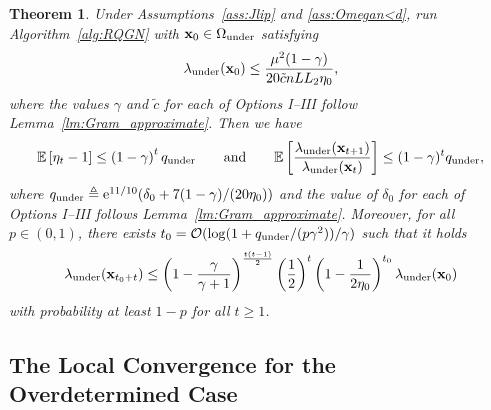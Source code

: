 \documentclass[11pt]{article}
\theoremstyle{plain}
\newtheorem{theorem}{Theorem}
\theoremstyle{definition}
\theoremstyle{remark}
\theoremstyle{plain}
\def\G{{\bf G}}
\def\I{{\bf I}}
\def\x{{\bf x}}
\def\OM{{\mathcal O}}
\def\EB{{\mathbb E}}
\def \EBP #1{\EB\left[#1\right]}
\begin{document}
\begin{theorem}
\label{thm:n<dsuperlinear}
    Under Assumptions~\ref{ass:Jlip} and \ref{ass:Omegan<d}, run Algorithm~\ref{alg:RQGN} with $\x_0\in\Omega_{\rm under}$ satisfying
    \begin{align}
    \label{eq:initial_condi_n<d}
        \lambda_{\mathrm{under}}(\x_0)\leq \frac{\mu^2(1-\gamma)}{20\tilde{c}nLL_2\eta_0},
    \end{align}
where the values $\gamma$ and $\tilde{c}$ for each of Options I--III follow Lemma~\ref{lm:Gram_approximate}.
Then we have
    \begin{align}
    \label{eq:expeta_tlambda_t}
        \EBP{\eta_t-1}\leq \left(1-\gamma\right)^tq_{\text{\rm under}}\qquad\text{and}\qquad\EBP{\frac{\lambda_{\mathrm{under}}(\x_{t+1})}{\lambda_{\mathrm{under}}(\x_t)}}\leq (1-\gamma)^tq_{\text{\rm under}},
    \end{align}
where $q_{\text{\rm under}}\triangleq {\rm e}^{11/10}(\delta_0+7(1-\gamma)/(20\eta_0))$
and the value of $\delta_0$ for each of Options I--III follows Lemma~\ref{lm:Gram_approximate}.
Moreover, for all $p\in(0,1)$, there exists $t_0=\OM(\log(1+q_{\text{\rm under}}/(p\gamma^2))/\gamma)$ such that it holds
    \begin{align*}
        \lambda_{\mathrm{under}}(\x_{t_0+t})\leq \left(1-\frac{\gamma}{\gamma+1}\right)^{\frac{t(t-1)}{2}}\left(\frac{1}{2}\right)^{t}\left(1-\frac{1}{2\eta_0}\right)^{t_0}\lambda_{\mathrm{under}}(\x_0)
    \end{align*}
with probability at least $1-p$ for all $t\geq1$.
\end{theorem}


\subsection{The Local Convergence for the Overdetermined Case}
\label{sec:overfit}
\end{document}

